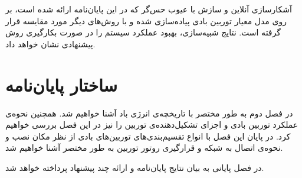 آشکارسازی آنلاین  و سازش با عیوب حس‌گر که در این پایان‌نامه ارائه شده است، بر روی مدل معیار توربین بادی پیاده‌سازی شده و با روش‌های دیگر مورد مقایسه قرار گرفته است. نتایج شبیه‌سازی، بهبود عملکرد سیستم را در صورت بکار‌گیری روش پیشنهادی نشان خواهد داد. 


\section{ساختار پایان‌نامه}
در فصل دوم  به طور مختصر با تاریخچه‌ی انرژی باد آشنا خواهیم شد. همچنین نحوه‌ی عملکرد توربین بادی و اجزای تشکیل‌دهنده‌ی توربین را نیز در این فصل بررسی خواهیم کرد. در پایان این فصل با انواع تقسیم‌بندی‌های توربین‌های بادی از نظر مکان نصب و نحوه‌ی اتصال به شبکه و قرار‌گیری روتور توربین به طور مختصر آشنا خواهیم شد.

در فصل پایانی به بیان نتایج پایان‌نامه و ارائه چند پیشنهاد پرداخته خواهد شد. 

